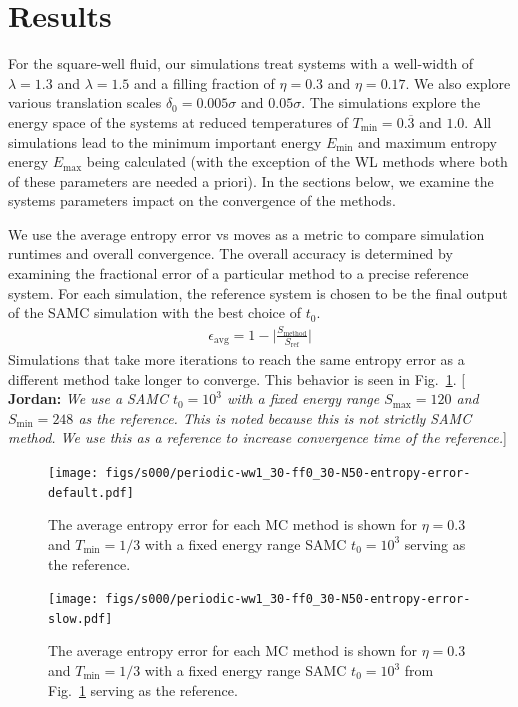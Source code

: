 \documentclass[letterpaper,twocolumn,amsmath,amssymb,pre,aps,10pt]{revtex4-1}
\newcommand{\blue}[1]{{\bf \color{blue} #1}}
\newcommand{\jpsays}[1]{{\color{red} [\blue{Jordan:} \emph{#1}]}}
\begin{document}
\section{Results}\label{sec:results}

For the square-well fluid, our simulations treat systems with a
well-width of $\lambda = 1.3$ and $\lambda = 1.5$ and a filling fraction of
$\eta = 0.3$ and $\eta = 0.17$. We also explore various translation scales $\delta_0 = 0.005\sigma$ and
$0.05\sigma$. The simulations explore the
energy space of the systems at reduced temperatures of
$T_{\text{min}} = 0.\overline{3}$ and $1.0$.  All simulations lead to the minimum important
energy $E_{\min}$ and maximum entropy energy $E_{\max}$
being calculated (with the exception of the WL methods where both
of these parameters are needed a priori).  In the sections below, we
examine the systems parameters impact on the convergence of the methods.

We use the average entropy error vs moves as a metric to compare
simulation runtimes and overall convergence. The overall accuracy
is determined by examining the fractional error of a particular method to
a precise reference system. For each simulation, the reference system
is chosen to be the final output of the SAMC simulation with the best
choice of $t_0$.
\begin{align}
\epsilon_\text{avg} = 1 - \bigg\lvert\frac{S_\text{method}}{S_\text{ref}}\bigg\rvert
\end{align}
Simulations that take more iterations to reach the same entropy error as a
different method take longer to converge. This behavior is seen in
Fig.~\ref{fig:N50-ff0.3-avg-error}.
\jpsays{We use a SAMC $t_0 = 10^3$ with a fixed energy range $S_{\max} = 120$ and $S_{\min} = 248$ as the reference.
This is noted because this is not strictly SAMC method. We use this as a reference to increase convergence time of the
reference.}
\begin{figure}
  \texttt{[image: figs/s000/periodic-ww1\_30-ff0\_30-N50-entropy-error-default.pdf]}
  \caption{The average entropy error for each MC method is shown for $\eta = 0.3$ and $T_{\min} = 1/3$ with
  a fixed energy range SAMC $t_0 = 10^3$ serving as the reference.}\label{fig:N50-ff0.3-avg-error}
\end{figure}
\begin{figure}
  \texttt{[image: figs/s000/periodic-ww1\_30-ff0\_30-N50-entropy-error-slow.pdf]}
  \caption{The average entropy error for each MC method is shown for $\eta = 0.3$ and $T_{\min} = 1/3$ with
  a fixed energy range SAMC $t_0 = 10^3$ from Fig.~\ref{fig:N50-ff0.3-avg-error}
  serving as the reference.}\label{fig:N50-ff0.3-avg-error-slow}
\end{figure}
\end{document}
